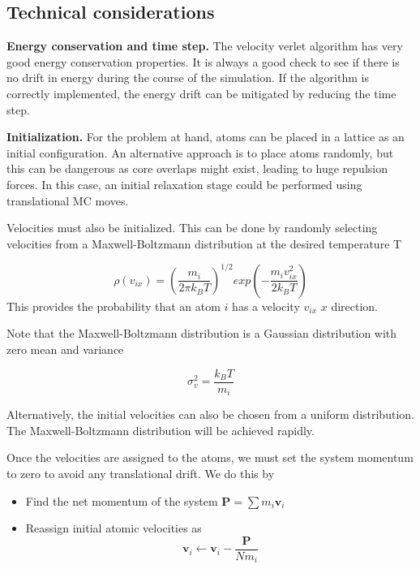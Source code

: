 \documentclass[aip,jcp,preprint,superscriptaddress,floatfix]{revtex4-1}
\begin{document}
\subsection{Technical considerations}

\textbf{Energy conservation and time step. } The velocity verlet algorithm has very good
energy conservation properties. It is always a good check to see if 
there is no drift in energy during the course of the simulation. If the algorithm 
is correctly implemented, the energy drift can be mitigated by reducing the 
time step. 

\textbf{Initialization. } For the problem at hand, atoms can be
placed in a lattice as an initial configuration.
An alternative approach is to place atoms randomly, but this can be
dangerous as core overlaps might exist, leading to huge repulsion forces. 
In this case, an initial relaxation stage could be performed using
translational MC moves.

Velocities must also be initialized. This can be done by randomly selecting
velocities
from a Maxwell-Boltzmann distribution at the desired temperature T

\begin{equation}
	\rho \left(v_{ix}\right) = \left( \frac{m_i}{2 \pi k_B T} \right) ^ {1/2} exp \left( - \frac{m_i v_{ix}^2 } {2 k_B T }  \right)
\end{equation}
%
This provides the probability that 
an atom $i$ has a velocity $v_{ix}$ $x$ direction.

Note that the Maxwell-Boltzmann distribution
is a Gaussian distribution with zero mean and variance

\begin{equation}
	\sigma_v^2 = \frac{k_B T}{m_i}
\end{equation}

Alternatively, the initial velocities can also be chosen from a uniform distribution.
The Maxwell-Boltzmann distribution will be achieved rapidly.

Once the velocities are assigned to the atoms, we must set the system momentum
to zero to avoid any translational drift. We do this by 

\begin{itemize}
	\item Find the net momentum of the system $\mathbf{P} = \sum m_i \mathbf{v}_i$
	\item Reassign initial atomic velocities as
		\begin{equation}
			\mathbf{v}_i \leftarrow \mathbf{v}_i - \frac{\mathbf{P}} { N m_i}
		\end{equation}
\end{itemize}
\end{document}
